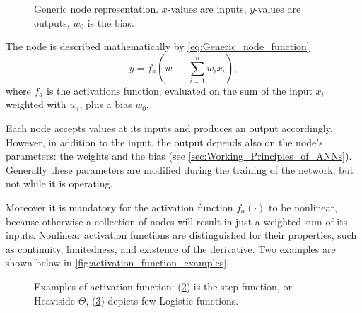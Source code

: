 \begin{figure}[ht]
	\centering
	
	\caption{Generic node representation. $x$-values are inputs, $y$-values are outputs, $w_0$ is the bias.}
	\label{fig:generic_node}
\end{figure}
The node is described mathematically by \cref{eq:Generic_node_function}
\begin{equation}
y = f_a \left(  w_0 + \sum_{i=1}^{n} w_i x_i \right),
\label{eq:Generic_node_function}
\end{equation}
where $f_a$ is the activations function, evaluated on the sum of the input $x_i$ weighted with $w_i$, plus a bias $w_0$.

Each node accepts values at its inputs and produces an output accordingly.
However, in addition to the input, the output depends also on the node's parameters: the weights and the bias (see \autoref{sec:Working_Principles_of_ANNs}).
Generally these parameters are modified during the training of the network, but not while it is operating.

Moreover it is mandatory for the activation function $f_a\left(\cdot\right)$ to be nonlinear, because otherwise a collection of nodes will result in just a weighted sum of its inputs.
Nonlinear activation functions are distinguished for their properties, such as continuity, limitedness, and existence of the derivative.
Two examples are shown below in \autoref{fig:activation_function_examples}.

\begin{figure}[ht]
	\begin{subfigure}[b]{0.49\textwidth}
		\centering
		
		\caption{}
		\label{fig:activation_function_example_1}
  \end{subfigure}
  \begin{subfigure}[b]{0.49\textwidth}
  		\centering
		
		\caption{}
		\label{fig:activation_function_example_2}
  \end{subfigure}
  \caption{Examples of activation function: (\ref{fig:activation_function_example_1}) is the step function, or Heaviside $\Theta$, (\ref{fig:activation_function_example_2}) depicts few Logistic functions.}
  	\label{fig:activation_function_examples}
\end{figure}


